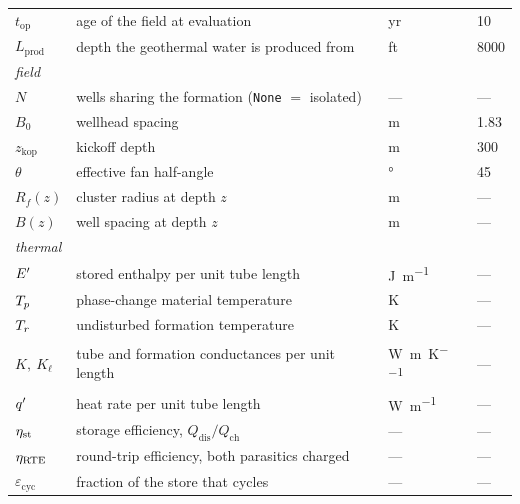 \begin{longtable}{llll}
$t_{\mathrm{op}}$ & age of the field at evaluation & \si{yr} & 10 \\
$L_{\mathrm{prod}}$ & depth the geothermal water is produced from & ft & 8000 \\
\midrule
\multicolumn{4}{l}{\textit{field}}\\
$N$           & wells sharing the formation (\texttt{None} $=$ isolated) & --- & --- \\
$B_0$         & wellhead spacing & \si{\metre} & 1.83 \\
$z_{\mathrm{kop}}$ & kickoff depth & \si{\metre} & 300 \\
$\theta$      & effective fan half-angle & \si{\degree} & 45 \\
$R_f(z)$      & cluster radius at depth $z$ & \si{\metre} & --- \\
$B(z)$        & well spacing at depth $z$ & \si{\metre} & --- \\
\midrule
\multicolumn{4}{l}{\textit{thermal}}\\
$E'$         & stored enthalpy per unit tube length & \si{\joule\per\metre} & --- \\
$T_{p}$       & phase-change material temperature & \si{\kelvin} & --- \\
$T_{r}$      & undisturbed formation temperature & \si{\kelvin} & --- \\
$K,\ K_\ell$  & tube and formation conductances per unit length & \si{\watt\per\metre\per\kelvin} & --- \\
$q'$         & heat rate per unit tube length & \si{\watt\per\metre} & --- \\
$\eta_{\mathrm{st}}$      & storage efficiency, $Q_{\mathrm{dis}}/Q_{\mathrm{ch}}$ & --- & --- \\
$\eta_{\mathrm{RTE}}$     & round-trip efficiency, both parasitics charged & --- & --- \\
$\varepsilon_{\mathrm{cyc}}$ & fraction of the store that cycles & --- & --- \\
\bottomrule
\end{longtable}

